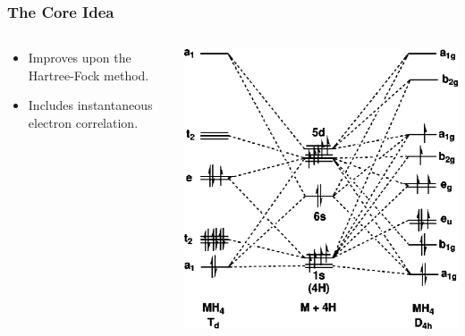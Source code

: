 \begin{frame}
    \frametitle{The Core Idea}
    \begin{columns}[T]
        \begin{column}{0.5\textwidth}
            \vspace{2cm}
            \begin{itemize}
                \item Improves upon the Hartree-Fock method.
                \item Includes instantaneous electron correlation.
            \end{itemize}
        \end{column}
        \begin{column}{0.5\textwidth}
            \includegraphics[width=\textwidth]{images/MP21.png}
        \end{column}
    \end{columns}
\end{frame}

